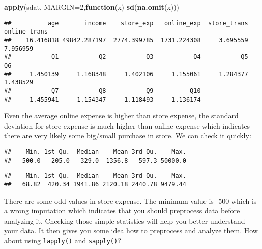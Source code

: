 \documentclass[
]{article}
\newenvironment{Shaded}{\begin{snugshade}}{\end{snugshade}}
\newcommand{\ControlFlowTok}[1]{\textcolor[rgb]{0.13,0.29,0.53}{\textbf{#1}}}
\newcommand{\DataTypeTok}[1]{\textcolor[rgb]{0.13,0.29,0.53}{#1}}
\newcommand{\DecValTok}[1]{\textcolor[rgb]{0.00,0.00,0.81}{#1}}
\newcommand{\KeywordTok}[1]{\textcolor[rgb]{0.13,0.29,0.53}{\textbf{#1}}}
\newcommand{\NormalTok}[1]{#1}
\newcommand{\OperatorTok}[1]{\textcolor[rgb]{0.81,0.36,0.00}{\textbf{#1}}}
\begin{document}
\begin{Shaded}
\begin{Highlighting}[]
\KeywordTok{apply}\NormalTok{(sdat, }\DataTypeTok{MARGIN=}\DecValTok{2}\NormalTok{,}\ControlFlowTok{function}\NormalTok{(x) }\KeywordTok{sd}\NormalTok{(}\KeywordTok{na.omit}\NormalTok{(x)))}
\end{Highlighting}
\end{Shaded}

\begin{verbatim}
##          age       income    store_exp   online_exp  store_trans online_trans 
##    16.416818 49842.287197  2774.399785  1731.224308     3.695559     7.956959 
##           Q1           Q2           Q3           Q4           Q5           Q6 
##     1.450139     1.168348     1.402106     1.155061     1.284377     1.438529 
##           Q7           Q8           Q9          Q10 
##     1.455941     1.154347     1.118493     1.136174
\end{verbatim}

Even the average online expense is higher than store expense, the
standard deviation for store expense is much higher than online expense
which indicates there are very likely some big/small purchase in store.
We can check it quickly:

\begin{Shaded}
\end{Shaded}

\begin{verbatim}
##    Min. 1st Qu.  Median    Mean 3rd Qu.    Max. 
##  -500.0   205.0   329.0  1356.8   597.3 50000.0
\end{verbatim}

\begin{Shaded}
\end{Shaded}

\begin{verbatim}
##    Min. 1st Qu.  Median    Mean 3rd Qu.    Max. 
##   68.82  420.34 1941.86 2120.18 2440.78 9479.44
\end{verbatim}

There are some odd values in store expense. The minimum value is -500
which is a wrong imputation which indicates that you should preprocess
data before analyzing it. Checking those simple statistics will help you
better understand your data. It then gives you some idea how to
preprocess and analyze them. How about using \texttt{lapply()} and
\texttt{sapply()}?
\end{document}

